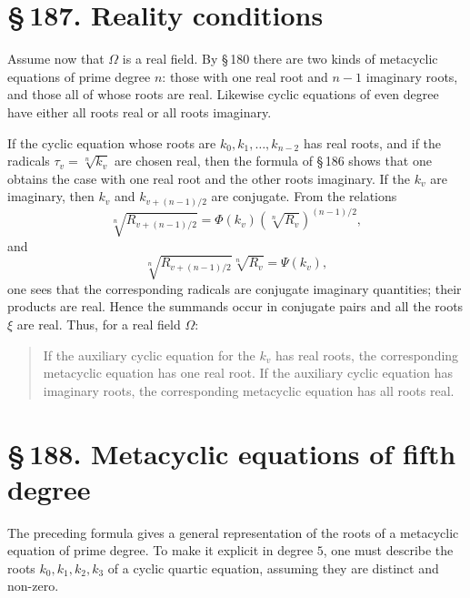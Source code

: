 \documentclass[11pt]{article}
\newcommand{\sect}[2]{\section*{\S\,#1. #2}}
\newcommand{\Om}{\Omega}
\begin{document}
\sect{187}{Reality conditions}

Assume now that $\Om$ is a real field. By \S\,180 there are two kinds of metacyclic equations of prime degree $n$: those with one real root and $n-1$ imaginary roots, and those all of whose roots are real. Likewise cyclic equations of even degree have either all roots real or all roots imaginary.

If the cyclic equation whose roots are $k_0,k_1,\ldots,k_{n-2}$ has real roots, and if the radicals $\tau_v=\sqrt[n]{k_v}$ are chosen real, then the formula of \S\,186 shows that one obtains the case with one real root and the other roots imaginary. If the $k_v$ are imaginary, then $k_v$ and $k_{v+(n-1)/2}$ are conjugate. From the relations
\begin{equation}
  \sqrt[n]{R_{v+(n-1)/2}}=\Phi(k_v)
  \left(\sqrt[n]{R_v}\right)^{(n-1)/2},
\end{equation}
and
\begin{equation}
  \sqrt[n]{R_{v+(n-1)/2}}\sqrt[n]{R_v}=\Psi(k_v),
\end{equation}
one sees that the corresponding radicals are conjugate imaginary quantities; their products are real. Hence the summands occur in conjugate pairs and all the roots $\xi$ are real. Thus, for a real field $\Om$:
\begin{quote}
If the auxiliary cyclic equation for the $k_v$ has real roots, the corresponding metacyclic equation has one real root. If the auxiliary cyclic equation has imaginary roots, the corresponding metacyclic equation has all roots real.
\end{quote}

\sect{188}{Metacyclic equations of fifth degree}

The preceding formula gives a general representation of the roots of a metacyclic equation of prime degree. To make it explicit in degree $5$, one must describe the roots $k_0,k_1,k_2,k_3$ of a cyclic quartic equation, assuming they are distinct and non-zero.
\end{document}
